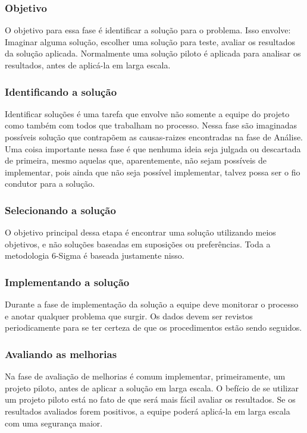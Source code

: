 \documentclass{abnt}
\begin{document}
					\subsubsection {Objetivo}
					O objetivo para essa fase é identificar a solução para o problema. Isso envolve: 
					Imaginar alguma solução, escolher uma solução para teste, avaliar os resultados da solução aplicada.
					Normalmente uma solução piloto é aplicada para analisar os resultados, antes de aplicá-la em larga escala.
					\subsubsection {Identificando a solução}
					Identificar soluções é uma tarefa que envolve não somente a equipe do projeto como também com todos que trabalham no processo. 
					Nessa fase são imaginadas possíveis solução que contrapõem as causas-raizes encontradas na fase de Análise.
					Uma coisa importante nessa fase é que nenhuma ideia seja julgada ou descartada de primeira, mesmo aquelas que, aparentemente, não sejam 
					possíveis de implementar, pois ainda que não seja possível implementar, talvez possa ser o fio condutor para a solução.
					\subsubsection {Selecionando a solução}
					O objetivo principal dessa etapa é encontrar uma solução utilizando meios objetivos, e não soluções 
					baseadas em suposições ou preferências. Toda a metodologia 6-Sigma é baseada justamente nisso.
					\subsubsection {Implementando a solução}
					Durante a fase de implementação da solução a equipe deve monitorar o processo e anotar qualquer problema que surgir.
					Os dados devem ser revistos periodicamente para se ter certeza de que os procedimentos estão sendo seguidos.
					\subsubsection {Avaliando as melhorias}
					Na fase de avaliação de melhorias é comum implementar, primeiramente, um projeto piloto, antes de aplicar a solução 
					em larga escala. O befício de se utilizar um projeto piloto está no fato de que será mais fácil avaliar os resultados. 
					Se os resultados avaliados forem positivos, a equipe poderá aplicá-la em larga escala com uma segurança maior.
\end{document}
